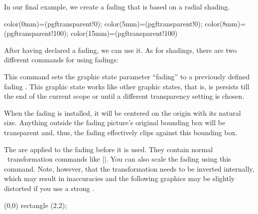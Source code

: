 \begin{command}{\pgfdeclarefading{}}
  In our final example, we create a fading that is based on a radial
  shading.
\begin{codeexample}[]
{
  color(0mm)=(pgftransparent!0);
  color(5mm)=(pgftransparent!0);
  color(8mm)=(pgftransparent!100);
  color(15mm)=(pgftransparent!100)
}
\end{codeexample}
\end{command}

After having declared a fading, we can use it. As for shadings, there
are two different commands for using fadings:

\begin{command}{\pgfsetfading{}}
  This command sets the graphic state parameter ``fading'' to a
  previously defined fading . This graphic state works like
  other graphic states, that is, is persists till the end of the
  current scope or until a different transparency setting is chosen.

  When the fading is installed, it will be centered on the origin with
  its natural size. Anything outside the fading picture's original
  bounding box will be transparent and, thus, the fading effectively
  clips against this bounding box.

  The  are applied to the fading before it is
  used. They contain normal \pgfname\ transformation commands like
  |\pgftransformshift|. You can also scale the fading using this
  command. Note, however, that the transformation needs to be inverted
  internally, which may result in inaccuracies and the following
  graphics may be slightly distorted if you use a strong
  .
\begin{codeexample}[]
{\tikz \shade[left color=pgftransparent!0,
              right color=pgftransparent!100] (0,0) rectangle (2,2);}
\end{codeexample}
\begin{codeexample}[]
\end{codeexample}
\end{command}

